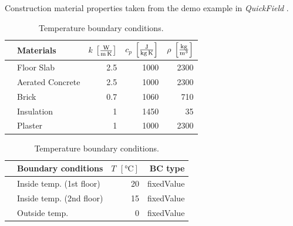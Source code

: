 \documentclass[runningheads]{llncs}
\begin{document}
   









\footnotesize
\begin{table}[bth]
    \centering
    
    
    \begin{minipage}{.5\linewidth}
      \caption{Construction material properties taken from the demo example in \textit{QuickField} \cite{quickfield}.}
      \label{tab:construction_material_properties}
      \centering
        
        \begin{tabular}{clrrr}    
            \toprule   
            & Materials       & $k$ $\left[ \si[per-mode=fraction]{\watt\per\metre\per\kelvin} \right]$ & $c_p$   $\left[ \si[per-mode=fraction]{\joule\per\kilogram\per\kelvin}\right]$ & $\rho$  $\left[ \si[per-mode=fraction]{\kilogram\per\cubic\metre} \right]$   \\ 
            \midrule
            & Floor Slab        & 2.5                        & 1000                      & 2300               \\
            & Aerated Concrete  & 2.5                        & 1000                      & 2300               \\
            & Brick             & 0.7                        & 1060                       & 710               \\
            & Insulation        & 1                         & 1450                      & 35               \\
            & Plaster           & 1                         & 1000                      & 2300              \\
            \bottomrule
        \end{tabular}
    \end{minipage}%
    \begin{minipage}{.5\linewidth}
      \caption{Temperature boundary conditions.}
      \label{tab:boundary_conditions}
      \centering
        \footnotesize
        \begin{tabular}{llrr}    
            \toprule   
            & Boundary conditions          & $T$ $[\si{\degreeCelsius}]$           & BC type                   \\ 
            \midrule
            & Inside temp.  (1st floor)         & 20                          & fixedValue                \\
            & Inside temp.  (2nd floor)          & 15                          & fixedValue                \\
            & Outside temp.  & 0                          & fixedValue                \\ 
            \bottomrule
        \end{tabular}
    \end{minipage}
\vspace{-0.3cm}
\end{table}
\normalsize
\end{document}
